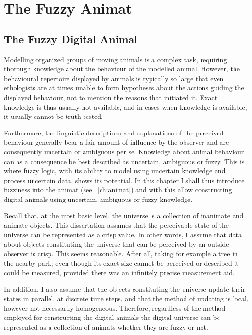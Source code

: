 









\chapter{The Fuzzy Animat}
\label{ch:fuzzyAnimat}


\section{The Fuzzy Digital Animal}
\label{sec:fuzzyAnimat}
Modelling organized groups of moving animals is a complex task, requiring thorough knowledge about the behaviour of the modelled animal. However, the behavioural repertoire displayed by animals is typically so large that even ethologists are at times unable to form hypotheses about the actions guiding the displayed behaviour, not to mention the reasons that initiated it. Exact knowledge is thus usually not available, and in cases when knowledge is available, it usually cannot be truth-tested.

Furthermore, the linguistic descriptions and explanations of the perceived behaviour generally bear a fair amount of influence by the observer and are consequently uncertain or ambiguous per se. Knowledge about animal behaviour can as a consequence be best described as uncertain, ambiguous or fuzzy. This is where fuzzy logic, with its ability to model using uncertain knowledge and process uncertain data, shows its potential. In this chapter I shall thus introduce fuzziness into the animat (see \chaptername~\ref{ch:animat}) and with this allow constructing digital animals using uncertain, ambiguous or fuzzy knowledge.

Recall that, at the most basic level, the universe is a collection of inanimate and animate objects. This dissertation assumes that the perceivable state of the universe can be represented as a crisp value. In other words, I assume that data about objects constituting the universe that can be perceived by an outside observer is crisp. This seems reasonable. After all, taking for example a tree in the nearby park; even though its exact size cannot be perceived or described it could be measured, provided there was an infinitely precise measurement aid.

In addition, I also assume that the objects constituting the universe update their states in parallel, at discrete time steps, and that the method of updating is local, however not necessarily homogeneous. Therefore, regardless of the method employed for constructing the digital animals the digital universe can be represented as a collection of animats whether they are fuzzy or not.

